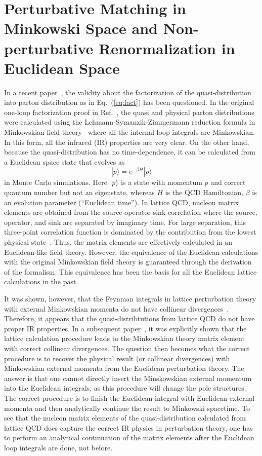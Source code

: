 \section{Perturbative Matching in Minkowski Space and Non-perturbative Renormalization in Euclidean Space}

In a recent paper~\cite{Carlson:2017gpk}, the validity about the factorization of
the quasi-distribution into parton distribution as in Eq.~(\ref{eq:fact}) has been questioned.
In the original one-loop factorization
proof in Ref.~\cite{Xiong:2013bka}, the quasi and physical parton distributions were
calculated using the Lehmann-Symanzik-Zimmermann reduction formula in Minkowskian field theory~\cite{Sterman:1994ce} where all the internal loop integrals are Minkowskian.
In this form, all the infrared (IR) properties are very clear. On the other hand, because the quasi-distribution
has no time-dependence, it can be calculated from a Euclidean space state that evolves as
\begin{equation}
|p\rangle = e^{-\beta H}|p)
\end{equation}
in Monte Carlo simulations. Here $|p\rm{)}$ is a state with momentum $p$ and correct quantum number but not an eigenstate, whereas $H$ is the QCD Hamiltonian, $\beta$ is an evolution parameter (``Euclidean time''). In lattice QCD, nucleon matrix elements are obtained from the source-operator-sink correlation where the source, operator, and sink are separated by imaginary time. For large separation, this three-point correlation function is dominated by the contribution from the lowest physical state~\cite{Rothe:1992nt}.
Thus, the matrix elements are effectively calculated in an Euclidean-like field theory. However,
the equivalence of the Euclidean calculations with the original Minkowskian field theory is guaranteed
through the derivation of the formalism. This equivalence has been the basis for all the
Euclidean lattice calculations in the past.

It was shown, however, that the Feynman integrals in lattice perturbation theory
with external Minkowskian momenta do not have collinear divergences~\cite{Carlson:2017gpk}. Therefore, it appears that the quasi-distribtutions from lattice QCD do not have proper IR properties.
In a subsequent paper~\cite{Briceno:2017cpo}, it was explicitly shown that the lattice
calculation procedure leads to the Minkowskian theory matrix element with correct collinear divergences.
The question then becomes what the correct procedure is to recover the physical
result (or collinear divergences) with Minkowskian external momenta from the
Euclidean perturbation theory. The answer is that one cannot directly insert
the Minskowskian external momentum into the Euclidean integrals, as this procedure will
change the pole structures. The correct procedure is to finish the Euclidean
integral with Euclidean external momenta and then analytically continue the result to Minkowski spacetime.
To see that the nucleon matrix elements of the quasi-distribution calculated from lattice QCD does capture the correct IR physics in perturbation theory, one has to perform an analytical continuation of the
matrix elements after the Euclidean loop integrals are done, not before.


